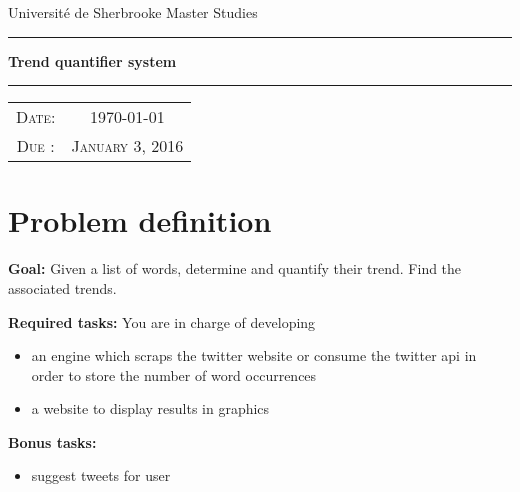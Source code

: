 \documentclass[]{class}
\begin{document}

Université de Sherbrooke\hfill
Master Studies
\par
\rule{\textwidth}{1pt}
\par\vspace{3pt}
\begin{center}
  \huge\textbf{\color{black}Trend quantifier system}
\end{center}
\par\vspace{3pt}
\rule{\textwidth}{1pt}

\par\vspace{15pt}

\begin{large}
  \begin{center}
  \begin{tabular}{c c}
    \textsc{Date:}& \textsc{\today}\\
    \textsc{Due :}& \textsc{January 3, 2016}\vspace{3ex}
  \end{tabular}
  \end{center}
\end{large}


\section{Problem definition}
{\large\textbf{Goal:}} Given a list of words, determine and quantify their trend. Find the associated trends.\\
\par
{\large\textbf{Required tasks:}} You are in charge of developing
\begin{itemize}
  \item an engine which scraps the twitter website or consume the twitter api in order to store the number of word occurrences
  \item a website to display results in graphics
\end{itemize}

\par\vspace{5pt}
{\large\textbf{Bonus tasks:}}
\begin{itemize}
  \item suggest tweets for user
\end{itemize}
\end{document}
